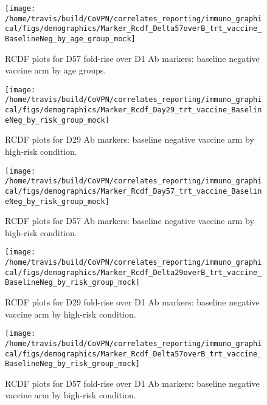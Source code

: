\documentclass[]{book}
\theoremstyle{definition}
\theoremstyle{definition}
\theoremstyle{definition}
\newcommand{\1}{\mathbbm{1}}
\begin{document}
\clearpage
\begin{figure}[H]

{\centering \texttt{[image: /home/travis/build/CoVPN/correlates\_reporting/immuno\_graphical/figs/demographics/Marker\_Rcdf\_Delta57overB\_trt\_vaccine\_BaselineNeg\_by\_age\_group\_mock]} 

}

\caption{RCDF plots for D57 fold-rise over D1 Ab markers: baseline negative vaccine arm by age groups.}\label{fig:unnamed-chunk-58}
\end{figure}

\clearpage
\begin{figure}[H]

{\centering \texttt{[image: /home/travis/build/CoVPN/correlates\_reporting/immuno\_graphical/figs/demographics/Marker\_Rcdf\_Day29\_trt\_vaccine\_BaselineNeg\_by\_risk\_group\_mock]} 

}

\caption{RCDF plots for D29 Ab markers: baseline negative vaccine arm by high-risk condition.}\label{fig:unnamed-chunk-59}
\end{figure}

\clearpage
\begin{figure}[H]

{\centering \texttt{[image: /home/travis/build/CoVPN/correlates\_reporting/immuno\_graphical/figs/demographics/Marker\_Rcdf\_Day57\_trt\_vaccine\_BaselineNeg\_by\_risk\_group\_mock]} 

}

\caption{RCDF plots for D57 Ab markers: baseline negative vaccine arm by high-risk condition.}\label{fig:unnamed-chunk-60}
\end{figure}

\clearpage
\begin{figure}[H]

{\centering \texttt{[image: /home/travis/build/CoVPN/correlates\_reporting/immuno\_graphical/figs/demographics/Marker\_Rcdf\_Delta29overB\_trt\_vaccine\_BaselineNeg\_by\_risk\_group\_mock]} 

}

\caption{RCDF plots for D29 fold-rise over D1 Ab markers: baseline negative vaccine arm by high-risk condition.}\label{fig:unnamed-chunk-61}
\end{figure}

\clearpage
\begin{figure}[H]

{\centering \texttt{[image: /home/travis/build/CoVPN/correlates\_reporting/immuno\_graphical/figs/demographics/Marker\_Rcdf\_Delta57overB\_trt\_vaccine\_BaselineNeg\_by\_risk\_group\_mock]} 

}

\caption{RCDF plots for D57 fold-rise over D1 Ab markers: baseline negative vaccine arm by high-risk condition.}\label{fig:unnamed-chunk-62}
\end{figure}
\end{document}
